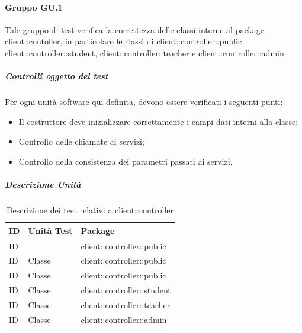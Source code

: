 \documentclass[12pt,a4paper]{article}
\begin{document}
\paragraph{Gruppo GU.1}
Tale gruppo di test verifica la correttezza delle classi interne al package client::contoller, in particolare le classi di client::controller::public, client::controller::student, client::controller::teacher e client::controller::admin.
\subparagraph{Controlli oggetto del test}
Per ogni unità software qui definita, devono essere verificati i seguenti punti:
\begin{itemize}
	\item Il costruttore deve inizializzare correttamente i campi dati interni alla classe;
	\item Controllo delle chiamate ai servizi;
	\item Controllo della consistenza dei parametri passati ai servizi.
\end{itemize}
\subparagraph{Descrizione Unità}
\begin{table}[H]
	\begin{center}
		\begin{tabular}{p{} p{} p{}}
			\toprule
			\textbf{ID}   & \textbf{Unità Test}	& \textbf{Package} \\ \midrule
			\midrule
			ID &  & client::controller::public\\ \midrule
			ID & Classe & client::controller::public\\ \midrule
			ID & Classe & client::controller::public\\ \midrule
			ID & Classe & client::controller::student\\ \midrule
			ID & Classe & client::controller::teacher\\ \midrule
			ID & Classe & client::controller::admin\\ \midrule
			
		 \bottomrule
		\end{tabular}
	\end{center}
	\caption{Descrizione dei test relativi a client::controller}
\end{table}
\end{document}
